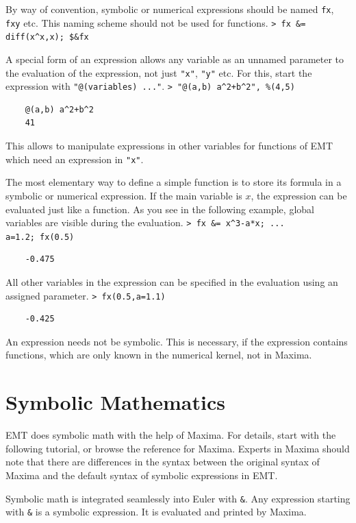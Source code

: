 \documentclass[11pt, a4paper]{article}
\newcommand{\emtcmd}[1]{\noindent\texttt{\textcolor{emtcommand}{>}\ #1}\par\smallskip}
\begin{document}
By way of convention, symbolic or numerical expressions should be named \texttt{fx}, \texttt{fxy} etc. This naming scheme should not be used for functions.
\emtcmd{fx \&= diff(x\^{}x,x); \$\&fx}

A special form of an expression allows any variable as an unnamed parameter to the evaluation of the expression, not just \texttt{"x"}, \texttt{"y"} etc. For this, start the expression with \texttt{"@(variables) ..."}.
\emtcmd{"@(a,b) a\^{}2+b\^{}2", \%(4,5)}
\begin{verbatim}
    @(a,b) a^2+b^2
    41
\end{verbatim}

This allows to manipulate expressions in other variables for functions of EMT which need an expression in \texttt{"x"}.

The most elementary way to define a simple function is to store its formula in a symbolic or numerical expression. If the main variable is $x$, the expression can be evaluated just like a function. As you see in the following example, global variables are visible during the evaluation.
\emtcmd{fx \&= x\^{}3-a*x; ... \\
\hspace*{1em} a=1.2; fx(0.5)}
\begin{verbatim}
    -0.475
\end{verbatim}

All other variables in the expression can be specified in the evaluation using an assigned parameter.
\emtcmd{fx(0.5,a=1.1)}
\begin{verbatim}
    -0.425
\end{verbatim}

An expression needs not be symbolic. This is necessary, if the expression contains functions, which are only known in the numerical kernel, not in Maxima.

\section*{Symbolic Mathematics}

EMT does symbolic math with the help of Maxima. For details, start with the following tutorial, or browse the reference for Maxima. Experts in Maxima should note that there are differences in the syntax between the original syntax of Maxima and the default syntax of symbolic expressions in EMT.

Symbolic math is integrated seamlessly into Euler with \texttt{\&}. Any expression starting with \texttt{\&} is a symbolic expression. It is evaluated and printed by Maxima.
\end{document}
